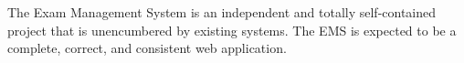 The Exam Management System is an independent and totally self-contained project that is unencumbered by existing systems. The EMS is expected to be a complete, correct, and consistent web application.